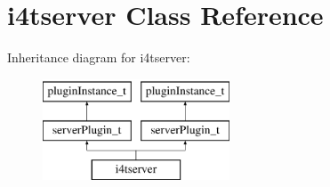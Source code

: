 \hypertarget{classi4tserver}{\section{i4tserver \-Class \-Reference}
\label{classi4tserver}
}
\-Inheritance diagram for i4tserver\-:\begin{figure}[H]
\begin{center}
\leavevmode
\includegraphics[height=3.000000cm]{classi4tserver}
\end{center}
\end{figure}
